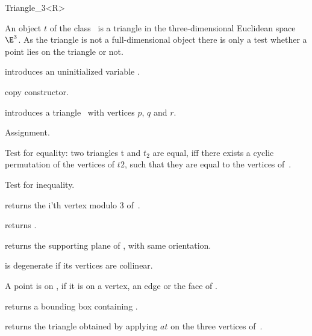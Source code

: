 \begin{ccRefClass} {Triangle_3<R>}

\ccDefinition  An object $t$ of the class \ccRefName\ is a triangle in
the three-dimensional Euclidean space $\E^3$. As the triangle is not
a full-dimensional object there is only a test whether a point lies on
the triangle or not.
 
\ccCreation
{}

\ccHidden {}
             {introduces an uninitialized variable \ccVar.}

\ccHidden {}
 	    {copy constructor.}

            {introduces a triangle \ccVar\ with vertices $p$, $q$ and $r$.}

\ccOperations

\ccHidden {}
        {Assignment.}

       {Test for equality: two triangles t and $t_2$ are equal, iff there 
        exists a cyclic permutation of the vertices of $t2$, such that 
        they are equal to the vertices of~\ccVar.}

       {Test for inequality.}

       {returns the i'th vertex modulo 3  of~\ccVar.}

       {returns .}

       {returns the supporting plane of \ccVar, with same
       orientation.}

\ccPredicates

       {{\ccVar} is degenerate if its vertices are collinear.}

       {A point is on \ccVar, if it is on a vertex, an edge or the
        face of \ccVar.}


       {returns a bounding box containing \ccVar.}

       {returns the triangle obtained by applying $at$ on the three
        vertices of~\ccVar.}
\end{ccRefClass} 
